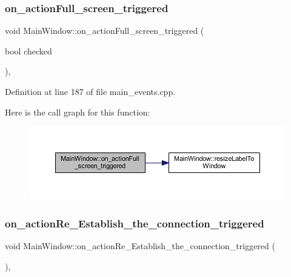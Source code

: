 \subsubsection{\texorpdfstring{on\_actionFull\_screen\_triggered}{on\_actionFull\_screen\_triggered}}
{\footnotesize\ttfamily void Main\+Window\+::on\+\_\+action\+Full\+\_\+screen\+\_\+triggered (\begin{DoxyParamCaption}\item[{bool}]{checked }\end{DoxyParamCaption})\hspace{0.3cm}{\ttfamily [private]}, {\ttfamily [slot]}}



Definition at line 187 of file main\+\_\+events.\+cpp.

Here is the call graph for this function\+:
\nopagebreak
\begin{figure}[H]
\begin{center}
\leavevmode
\includegraphics[width=350pt]{classMainWindow_ad210784d93519aa0e1664b943142ad97_cgraph}
\end{center}
\end{figure}
\mbox{\label{classMainWindow_abe15cc441416a5266df8770298aca76b}} 
\subsubsection{\texorpdfstring{on\_actionRe\_Establish\_the\_connection\_triggered}{on\_actionRe\_Establish\_the\_connection\_triggered}}
{\footnotesize\ttfamily void Main\+Window\+::on\+\_\+action\+Re\+\_\+\+Establish\+\_\+the\+\_\+connection\+\_\+triggered (\begin{DoxyParamCaption}{ }\end{DoxyParamCaption})\hspace{0.3cm}{\ttfamily [private]}, {\ttfamily [slot]}}



